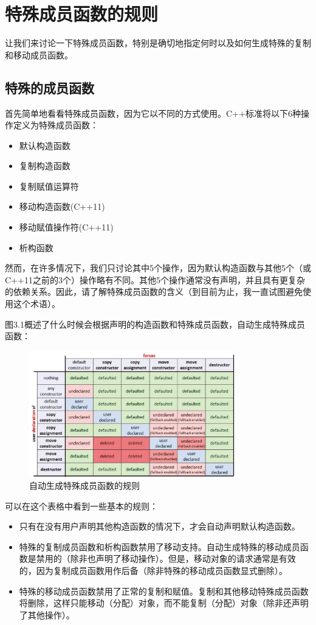 \section{特殊成员函数的规则}
让我们来讨论一下特殊成员函数，特别是确切地指定何时以及如何生成特殊的复制和移动成员函数。

\subsection{特殊的成员函数}

首先简单地看看特殊成员函数，因为它以不同的方式使用。C++标准将以下6种操作定义为特殊成员函数：

\begin{itemize}
	\item 默认构造函数
	\item 复制构造函数
	\item 复制赋值运算符
	\item 移动构造函数(C++11)
	\item 移动赋值操作符(C++11)
	\item 析构函数
\end{itemize}

然而，在许多情况下，我们只讨论其中5个操作，因为默认构造函数与其他5个（或C++11之前的3个）操作略有不同。其他5个操作通常没有声明，并且具有更复杂的依赖关系。因此，请了解特殊成员函数的含义（到目前为止，我一直试图避免使用这个术语）。

图3.1概述了什么时候会根据声明的构造函数和特殊成员函数，自动生成特殊成员函数：

\begin{figure}
	\includegraphics[width=0.8\textwidth]{part1/ch3/images/1}
	\caption{自动生成特殊成员函数的规则}
\end{figure}


可以在这个表格中看到一些基本的规则：

\begin{itemize}
	\item 只有在没有用户声明其他构造函数的情况下，才会自动声明默认构造函数。
	\item 特殊的复制成员函数和析构函数禁用了移动支持。自动生成特殊的移动成员函数是禁用的（除非也声明了移动操作）。但是，移动对象的请求通常是有效的，因为复制成员函数用作后备（除非特殊的移动成员函数显式删除）。
	\item 特殊的移动成员函数禁用了正常的复制和赋值。复制和其他移动特殊成员函数将删除，这样只能移动（分配）对象，而不能复制（分配）对象（除非还声明了其他操作）。
\end{itemize}


